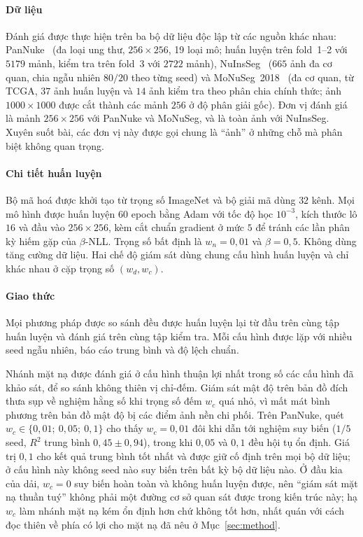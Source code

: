 \documentclass[preprint,12pt]{elsarticle}
\begin{document}
\paragraph{Dữ liệu} Đánh giá được thực hiện trên ba bộ dữ liệu độc lập từ các nguồn khác nhau:
PanNuke~\cite{pannuke} (đa loại ung thư, $256\times256$, 19 loại mô; huấn luyện trên fold~1--2 với $5179$ mảnh,
kiểm tra trên fold~3 với $2722$ mảnh), NuInsSeg~\cite{nuinsseg} ($665$ ảnh đa cơ quan, chia ngẫu nhiên $80/20$ theo
từng seed) và MoNuSeg~2018~\cite{monuseg} (đa cơ quan, từ TCGA, $37$ ảnh huấn luyện và $14$ ảnh kiểm tra theo phân
chia chính thức; ảnh $1000\times1000$ được cắt thành các mảnh $256$ ở độ phân giải gốc). Đơn vị đánh giá là mảnh
$256\times256$ với PanNuke và MoNuSeg, và là toàn ảnh với NuInsSeg. Xuyên suốt bài, các đơn vị này được gọi chung
là ``ảnh'' ở những chỗ mà phân biệt không quan trọng.

\paragraph{Chi tiết huấn luyện} Bộ mã hoá được khởi tạo từ trọng số ImageNet và bộ giải mã dùng $32$ kênh. Mọi mô
hình được huấn luyện $60$ epoch bằng Adam với tốc độ học $10^{-3}$, kích thước lô $16$ và đầu vào $256\times256$,
kèm cắt chuẩn gradient ở mức $5$ để tránh các lần phân kỳ hiếm gặp của $\beta$-NLL. Trọng số bất định là
$w_n = 0{,}01$ và $\beta = 0{,}5$. Không dùng tăng cường dữ liệu. Hai chế độ giám sát dùng chung cấu hình huấn
luyện và chỉ khác nhau ở cặp trọng số $(w_d, w_c)$.

\paragraph{Giao thức} Mọi phương pháp được so sánh đều được huấn luyện lại từ đầu trên cùng tập huấn luyện và
đánh giá trên cùng tập kiểm tra. Mỗi cấu hình được lặp với nhiều seed ngẫu nhiên, báo cáo trung bình và độ lệch
chuẩn.

Nhánh mặt nạ được đánh giá ở cấu hình thuận lợi nhất trong số các cấu hình đã khảo sát, để so sánh không thiên vị
chỉ-đếm. Giám sát mật độ trên bản đồ đích thưa sụp về nghiệm hằng số khi trọng số đếm $w_c$ quá nhỏ, vì mất mát
bình phương trên bản đồ mật độ bị các điểm ảnh nền chi phối. Trên PanNuke, quét
$w_c \in \{0{,}01;\ 0{,}05;\ 0{,}1\}$ cho thấy $w_c = 0{,}01$ đôi khi dẫn tới nghiệm suy biến ($1/5$ seed, $R^2$
trung bình $0{,}45 \pm 0{,}94$), trong khi $0{,}05$ và $0{,}1$ đều hội tụ ổn định. Giá trị $0{,}1$ cho kết quả
trung bình tốt nhất và được giữ cố định trên mọi bộ dữ liệu; ở cấu hình này không seed nào suy biến trên bất kỳ bộ
dữ liệu nào. Ở đầu kia của dải, $w_c = 0$ suy biến hoàn toàn và không huấn luyện được, nên ``giám sát mặt nạ thuần
tuý'' không phải một đường cơ sở quan sát được trong kiến trúc này; hạ $w_c$ làm nhánh mặt nạ kém ổn định hơn chứ
không tốt hơn, nhất quán với cách đọc thiên về phía có lợi cho mặt nạ đã nêu ở Mục~\ref{sec:method}.
\end{document}
